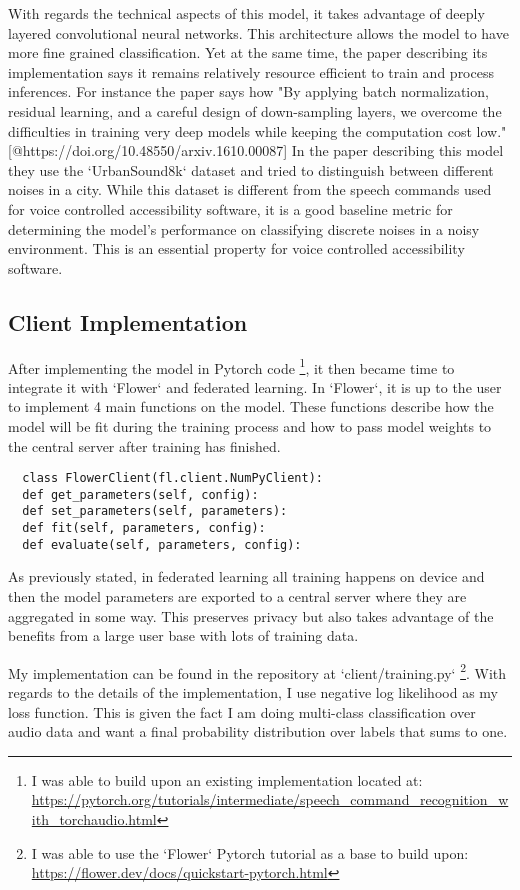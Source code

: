 \documentclass[manuscript,screen,review]{acmart}
\begin{document}
With regards the technical aspects of this model, it takes advantage of deeply layered convolutional neural networks. This architecture allows the model to have more fine grained classification. Yet at the same time, the paper describing its implementation says it remains relatively resource efficient to train and process inferences. For instance the paper says how "By applying batch normalization, residual learning, and a careful design of down-sampling layers, we overcome the difficulties in training very deep models while keeping the computation cost low." [@https://doi.org/10.48550/arxiv.1610.00087] In the paper describing this model they use the `UrbanSound8k` dataset and tried to distinguish between different noises in a city. While this dataset is different from the speech commands used for voice controlled accessibility software, it is a good baseline metric for determining the model's performance on classifying discrete noises in a noisy environment. This is an essential property for voice controlled accessibility software.

\subsection{Client Implementation}

After implementing the model in Pytorch code \footnote{I was able to build upon an existing implementation located at: \url{https://pytorch.org/tutorials/intermediate/speech_command_recognition_with_torchaudio.html}}, it then became time to integrate it with `Flower` and federated learning. In `Flower`, it is up to the user to implement 4 main functions on the model. These functions describe how the model will be fit during the training process and how to pass model weights to the central server after training has finished.

\begin{verbatim}
  class FlowerClient(fl.client.NumPyClient):
  def get_parameters(self, config):
  def set_parameters(self, parameters):
  def fit(self, parameters, config):
  def evaluate(self, parameters, config):
\end{verbatim}


As previously stated, in federated learning all training happens on device and then the model parameters are exported to a central server where they are aggregated in some way. This preserves privacy but also takes advantage of the benefits from a large user base with lots of training data.

My implementation can be found in the repository at `client/training.py` \footnote{I was able to use the `Flower` Pytorch tutorial as a base to build upon: \url{https://flower.dev/docs/quickstart-pytorch.html}}. With regards to the details of the implementation, I use negative log likelihood as my loss function. This is given the fact I am doing multi-class classification over audio data and want a final probability distribution over labels that sums to one.
\end{document}

